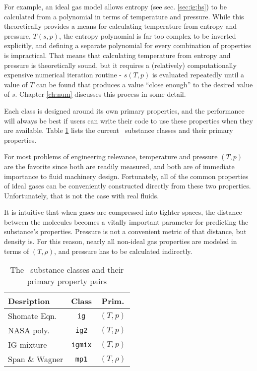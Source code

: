 For example, an ideal gas model allows entropy (see sec. \ref{sec:ig:hs}) to be calculated from a polynomial in terms of temperature and pressure.  While this theoretically provides a means for calculating temperature from entropy and pressure, $T(s,p)$, the entropy polynomial is far too complex to be inverted explicitly, and defining a separate polynomial for every combination of properties is impractical.  That means that calculating temperature from entropy and pressure is theoretically sound, but it requires a (relatively) computationally expensive numerical iteration routine - $s(T,p)$ is evaluated repeatedly until a value of $T$ can be found that produces a value ``close enough'' to the desired value of $s$.  Chapter \ref{ch:num} discusses this process in some detail.

Each class is designed around its own primary properties, and the performance will always be best if users can write their code to use these properties when they are available.  Table \ref{tab:primary} lists the current \PM\ substance classes and their primary properties.

For most problems of engineering relevance, temperature and pressure $(T,p)$ are the favorite since both are readily measured, and both are of immediate importance to fluid machinery design.  Fortunately, all of the common properties of ideal gases can be conveniently constructed directly from these two properties.  Unfortunately, that is not the case with real fluids.

It is intuitive that when gases are compressed into tighter spaces, the distance between the molecules becomes a vitally important parameter for predicting the substance's properties.  Pressure is not a convenient metric of that distance, but density is.  For this reason, nearly all non-ideal gas properties are modeled in terms of $(T,\rho)$, and pressure has to be calculated indirectly. 

\begin{table}
\centering
\caption{The \PM\ substance classes and their primary property pairs}\label{tab:primary}
\begin{tabular}{|lcc|}
\hline
Desription & Class & Prim.\\
\hline
Shomate Eqn. & \verb|ig| & $(T,p)$\\
NASA poly. & \verb|ig2| & $(T,p)$\\
IG mixture & \verb|igmix| & $(T,p)$\\
Span \& Wagner & \verb|mp1| & $(T,\rho)$\\
\hline
\end{tabular}
\end{table}

